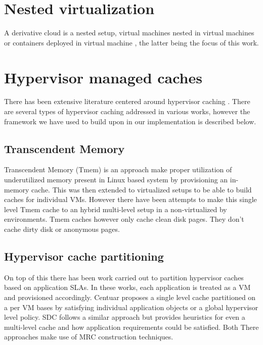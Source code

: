  \section{Nested virtualization}
    A derivative cloud is a nested setup, virtual machines nested in virtual machines\cite{williams2012xen} or containers deployed in virtual machine 
    \cite{sharma2015spotcheck, gcp}, the latter being the focus of this work.  
    
  \section{Hypervisor managed caches}
    There has been extensive literature centered around hypervisor caching
    \cite{lu2007virtual, mishra2014comparative, schopp2006resizing}.
    There are several types of hypervisor caching addressed in various works, however the framework 
    we have used to build upon in our implementation is described below. 
    
    \subsection{Transcendent Memory}
      Transcendent Memory (Tmem)\cite{magenheimer2009transcendent} is an approach make proper utilization of underutilized
      memory present in Linux based system by provisioning an in-memory cache. This was then extended to virtualized setups
      to be able to build caches for individual VMs. However there have been attempts \cite{venkatesan2014ex} to make this 
      single level Tmem cache to an hybrid multi-level setup in a non-virtualized by environments. Tmem caches however only
      cache clean disk pages. They don't cache dirty disk or anonymous pages.
      
   \subsection{Hypervisor cache partitioning}
    
       On top of this there has been work carried out to partition hypervisor caches based on 
       application SLAs\cite{schopp2006resizing, koller2015centaur}. In these works, each application 
       is treated as a VM and provisioned accordingly. Centuar\cite{koller2015centaur} proposes a single
       level cache partitioned on a per VM bases by satisfying individual application objects or a global
       hypervisor level policy. SDC\cite{schopp2006resizing} follows a similar approach but provides 
       heuristics for even a multi-level cache and how application requirements could be satisfied. Both
       There approaches make use of MRC construction techniques\cite{zhou2004dynamic, zhao2011low, waldspurger2015efficient}.  
  

